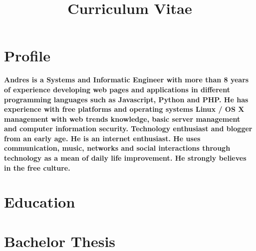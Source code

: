 \documentclass[11pt,a4paper,sans]{moderncv} %
\title{Curriculum Vitae}
\begin{document}
\makecvtitle %


\section{Profile}
\textbf{Andres is a Systems and Informatic Engineer with more than 8 years of experience developing web pages and applications in different programming languages such as Javascript, Python and PHP. He has experience with free platforms and operating systems Linux / OS X management with web trends knowledge, basic server management and computer information security. Technology enthusiast and blogger from an early age.
\newline
He is an internet enthusiast. He uses communication, music, networks and social interactions through technology as a mean of daily life improvement. He strongly believes in the free culture.}


\section{Education}


\section{Bachelor Thesis}



\newpage
\end{document}
